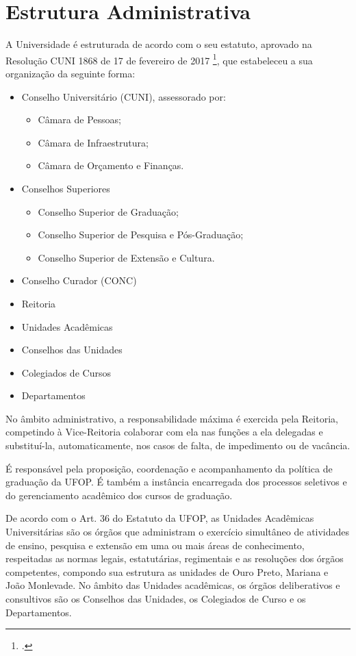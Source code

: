 \documentclass[
	12pt,				%
	openright,			%
	oneside,			%
	a4paper,			%
	english,			%
	brazil				%
	]{abntex2}
\begin{document}
\section{Estrutura Administrativa}
A Universidade é estruturada de acordo com o  seu estatuto, aprovado na Resolução CUNI 1868 de 17 de fevereiro de 2017 \footcite{resolucao-cuni-1868}, que estabeleceu a sua organização da seguinte forma:
\begin{itemize}
    \item Conselho Universitário (CUNI), assessorado por:
    \begin{itemize}
      \item Câmara de Pessoas;
      \item Câmara de Infraestrutura;
      \item Câmara de Orçamento e Finanças.
    \end{itemize}
    \item Conselhos Superiores
    \begin{itemize}
        \item Conselho Superior de Graduação;
        \item Conselho Superior de Pesquisa e Pós-Graduação;
        \item Conselho Superior de Extensão e Cultura.
    \end{itemize}
    \item Conselho Curador (CONC)
    \item Reitoria
    \item Unidades Acadêmicas
    \item Conselhos das Unidades
    \item Colegiados de Cursos
    \item Departamentos
\end{itemize}

No âmbito administrativo, a responsabilidade máxima é exercida pela Reitoria, competindo à Vice-Reitoria colaborar com ela nas funções a ela delegadas e substituí-la, automaticamente, nos casos de falta, de impedimento ou de vacância.

É responsável pela proposição, coordenação e acompanhamento da política de graduação da UFOP. É também a instância encarregada dos processos seletivos e do gerenciamento acadêmico dos cursos de graduação.

De acordo com o Art. 36 do Estatuto da UFOP, as Unidades Acadêmicas Universitárias são os órgãos que administram o exercício simultâneo de atividades de ensino, pesquisa e extensão em uma ou mais áreas de conhecimento, respeitadas as normas legais, estatutárias, regimentais e as resoluções dos órgãos competentes, compondo sua estrutura as unidades de Ouro Preto, Mariana e João Monlevade. No âmbito das Unidades acadêmicas, os órgãos deliberativos e consultivos são os Conselhos das Unidades, os Colegiados de Curso e os Departamentos.
%
\end{document}
